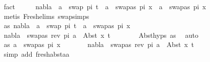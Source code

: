 \begin{isabellebody}
\ fact\isanewline
\ \ \isamarkupfalse%
\ \isamarkupfalse%
\ {\isachardoublequoteopen}{\isacharparenleft}{\kern0pt}nabla\ {\isasymturnstile}\ a\ {\isasymsharp}\ swap\ pi\ t\ {\isasymand}\ a\ {\isasymnoteq}\ swapas\ pi\ x{}{\isacharparenright}{\kern0pt}\ {\isasymor}\ {\isacharparenleft}{\kern0pt}a\ {\isacharequal}{\kern0pt}\ swapas\ pi\ x{}{\isacharparenright}{\kern0pt}{\isachardoublequoteclose}\isanewline
\ \ \ \ \isamarkupfalse%
\ {\isacharparenleft}{\kern0pt}metis\ Fresh{\isacharunderscore}{\kern0pt}elims{\isacharparenleft}{\kern0pt}{}{\isacharparenright}{\kern0pt}\ swap{\isachardot}{\kern0pt}simps{\isacharparenleft}{\kern0pt}{}{\isacharparenright}{\kern0pt}{\isacharparenright}{\kern0pt}\isanewline
\ \ \isamarkupfalse%
\ \isakeywordONE{{\isacharbraceleft}{\kern0pt}}\isamarkupfalse%
\isanewline
\ \ \ \ \isamarkupfalse%
\ as{\isacharcolon}{\kern0pt}\ {\isachardoublequoteopen}nabla\ {\isasymturnstile}\ a\ {\isasymsharp}\ swap\ pi\ t\ {\isasymand}\ a\ {\isasymnoteq}\ swapas\ pi\ x{}{\isachardoublequoteclose}\ \isanewline
\ \ \ \ \isamarkupfalse%
\ {\isachardoublequoteopen}nabla\ {\isasymturnstile}\ swapas\ {\isacharparenleft}{\kern0pt}rev\ pi{\isacharparenright}{\kern0pt}\ a\ {\isasymsharp}\ Abst\ x{}\ t{\isachardoublequoteclose}\isanewline
\ \ \ \ \ \ \isamarkupfalse%
\ Abst{\isachardot}{\kern0pt}hyps\ as\ \isamarkupfalse%
\ auto\ \isanewline
\ \ \isakeywordONE{{\isacharbraceright}{\kern0pt}}\isamarkupfalse%
\isanewline
\ \ \isamarkupfalse%
\ \isakeywordONE{{\isacharbraceleft}{\kern0pt}}\isamarkupfalse%
\isanewline
\ \ \ \ \isamarkupfalse%
\ as{\isacharcolon}{\kern0pt}\ {\isachardoublequoteopen}a\ {\isacharequal}{\kern0pt}\ swapas\ pi\ x{}{\isachardoublequoteclose}\isanewline
\ \ \ \ \isamarkupfalse%
\ \isamarkupfalse%
\ {\isachardoublequoteopen}nabla\ {\isasymturnstile}\ swapas\ {\isacharparenleft}{\kern0pt}rev\ pi{\isacharparenright}{\kern0pt}\ a\ {\isasymsharp}\ Abst\ x{}\ t{\isachardoublequoteclose}\isanewline
\ \ \ \ \ \ \isamarkupfalse%
\ {\isacharparenleft}{\kern0pt}simp\ add{\isacharcolon}{\kern0pt}\ fresh{\isacharunderscore}{\kern0pt}abst{\isacharunderscore}{\kern0pt}aa{\isacharparenright}{\kern0pt}\ \ \ \ \ \ \isanewline
\ \ \isakeywordONE{{\isacharbraceright}{\kern0pt}}\isamarkupfalse%

\end{isabellebody}
